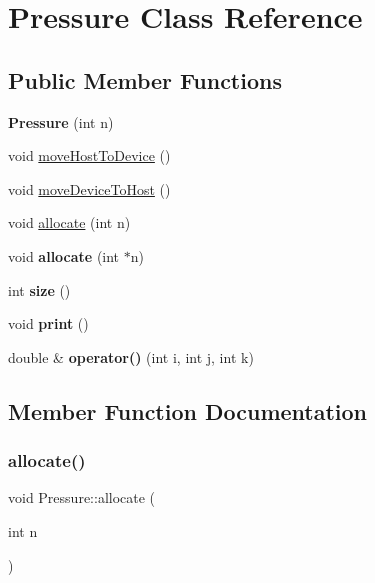 \hypertarget{classPressure}{}\section{Pressure Class Reference}
\label{classPressure}
\subsection*{Public Member Functions}
\begin{DoxyCompactItemize}
\item 
\mbox{\label{classPressure_af34806723618c6bcebbe2033162b253d}} 
{\bfseries Pressure} (int n)
\item 
void \mbox{\hyperlink{classPressure_aa02dc96fad914b90ebd39255b7c3d56a}{move\+Host\+To\+Device}} ()
\item 
void \mbox{\hyperlink{classPressure_a0e275e2d44ba8e2c94baf98b2feb1475}{move\+Device\+To\+Host}} ()
\item 
void \mbox{\hyperlink{classPressure_ac3f1dc4affacffeb33ce264188c1b0f1}{allocate}} (int n)
\item 
\mbox{\label{classPressure_ac549de0c8792e2508afc6a1053415108}} 
void {\bfseries allocate} (int $\ast$n)
\item 
\mbox{\label{classPressure_a1187c17a50834da477e45a213288f876}} 
int {\bfseries size} ()
\item 
\mbox{\label{classPressure_a9c17e460745c731386ae3d4017932f85}} 
void {\bfseries print} ()
\item 
\mbox{\label{classPressure_a81100e3254d3224de280e106746a3f2d}} 
double \& {\bfseries operator()} (int i, int j, int k)
\end{DoxyCompactItemize}


\subsection{Member Function Documentation}
\mbox{\label{classPressure_ac3f1dc4affacffeb33ce264188c1b0f1}} 
\subsubsection{\texorpdfstring{allocate()}{allocate()}}
{\footnotesize\ttfamily void Pressure\+::allocate (\begin{DoxyParamCaption}\item[{int}]{n }\end{DoxyParamCaption})}

